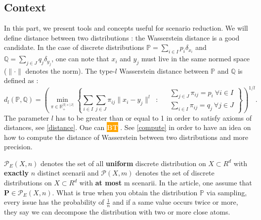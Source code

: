 \documentclass{amsart}
\newcommand{\nb}[3]{
		{\colorbox{#2}{\bfseries\sffamily\tiny\textcolor{white}{#1}}}
		{\textcolor{#2}{\text{$\blacktriangleright$}{\textcolor{#2}{#3}}\text{$\blacktriangleleft$}}}}
\newcommand{\bt}[1]{\nb{BT}{orange}{#1}}
\begin{document}
\subsection{Context}
In this part, we present tools and concepts useful for scenario reduction. We will define distance between two distributions : the Wasserstein distance is a good candidate. In the case of discrete distributions $\mathbb{P}=\sum_{i\in I}p_i\delta_{x_i}$ and $\mathbb{Q}=\sum_{j\in J}q_j\delta_{y_j}$, one can note that $x_i$ and $y_j$ must live in the same normed space ($\lVert\cdot\rVert$ denotes the norm). The type-$l$ Wasserstein distance between $\mathbb{P}$ and $\mathbb{Q}$ is defined as :  
\[
d_l(\mathbb{P},\mathbb{Q})=\left(\min_{\pi\in\mathbb{R_+^{|I|\times|J|}}}\left\{ 
\sum_{i\in I}\sum_{j\in J}\pi_{ij}\lVert x_i-y_j\rVert^l \: \text{ : } \:  \begin{aligned}
& \sum_{j\in J}\pi_{ij}=p_i \: \forall i\in I \\
& \sum_{i\in I}\pi_{ij}=q_j \: \forall j\in J
\end{aligned}\right\}\right)^{1/l}.
\]
The parameter $l$ has to be greater than or equal to 1 in order to satisfy axioms of distances, see \ref{distance}. One can \bt{To prove that $d^\ell$ is distance, the difficult part is the triangle inequality. It is a distance for $\ell \geq 1$ and the proof of the triangle inequality is here called the "gluing lemma" (Peyré-Cuturi chapter 1 for our "simple" case). This gluing lemma uses Minkowski's inequality in the case $\ell\geq1$ so that's the reason why. 
It is still an interesting question for $0 < \ell \leq 1$. We have $d_\ell^\ell$ (and not $d\ell$ itself) is a distance as $(x,y) \mapsto \lVert x - y \rVert^\ell$ is already a distance when $0 < \ell \leq 1$ thanks to Minkowski's inequality in the case $\ell \leq 1$.
}. See \ref{compute} in order to have an idea on how to compute the distance of Wasserstein between two distributions and more precision.
\newline

$\mathcal{P}_E(X,n)$ denotes the set of all \textbf{uniform} discrete distribution on $X\subset R^d$ with \textbf{exactly} $n$ distinct scenarii and $\mathcal{P}(X,m)$ denotes the set of discrete distributions on $X\subset R^d$ with \textbf{at most} m scenarii. In the article, one assume that $\mathbf{P}\in\mathcal{P}_E(X,n)$. What is true when you obtain the distribution $\mathbb{P}$ via sampling, every issue has the probability of $\frac{1}{n}$ and if a same value occurs twice or more, they say we can decompose the distribution with two or more close atoms.
\newline
\end{document}
